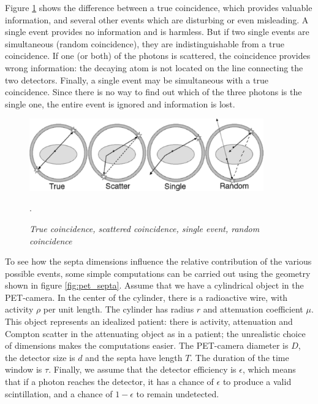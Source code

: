 \documentclass[11pt,oneside]{book}
\begin{document}
Figure \ref{fig:pet_random_enzo} shows the difference between a true
coincidence, which provides valuable information, and several other events
which are disturbing or even misleading. A single event provides no
information and is harmless. But if two single events are simultaneous (random
coincidence), they are indistinguishable from a true coincidence. If one (or
both) of the photons is scattered, the coincidence provides wrong information:
the decaying atom is not located on the line connecting the two
detectors. Finally, a single event may be simultaneous with a true
coincidence. Since there is no way to find out which of the three photons is
the single one, the entire event is ignored and information is lost.

\begin{figure}[tb]
\centering
\includegraphics[width=0.9\textwidth]{figs/fig_pet_random_enzo.pdf}
\caption{\label{fig:pet_random_enzo} \emph{True coincidence, scattered
coincidence, single event, random coincidence}}.
\end{figure}

To see how the septa dimensions influence the relative contribution of the
various possible events, some simple computations can be carried out using the
geometry shown in figure \ref{fig:pet_septa}. Assume that we have a
cylindrical object in the PET-camera. In the center of the cylinder, there is
a radioactive wire, with activity $\rho$ per unit length. The cylinder has
radius $r$ and attenuation coefficient $\mu$. This object represents an
idealized patient: there is activity, attenuation and Compton scatter in the
attenuating object as in a patient; the unrealistic choice of dimensions makes
the computations easier. The PET-camera diameter is $D$, the detector size is
$d$ and the septa have length $T$. The duration of the time window is
$\tau$. Finally, we assume that the detector efficiency is $\epsilon$, which
means that if a photon reaches the detector, it has a chance of $\epsilon$ to
produce a valid scintillation, and a chance of $1 - \epsilon$ to remain
undetected.\\[2mm]
\end{document}
